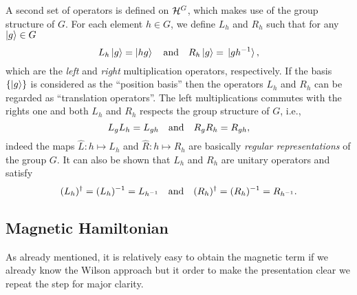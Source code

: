 A second set of operators is defined on $\mathcal{H}^{G}$, which makes use of the group structure of $G$.
For each element $h \in G$, we define $L_h$ and $R_h$ such that for any $\ket{g} \in G$
\begin{equation}
    L_h \ket{g} = \ket{hg}
    \qand
    R_h \ket{g} = \ket*{gh^{-1}},
\end{equation}
which are the \emph{left} and \emph{right} multiplication operators, respectively.
If the basis $\{\ket{g}\}$ is considered as the ``position basis'' then the operators $L_h$ and $R_h$ can be regarded as ``translation operators''.
The left multiplications commutes with the rights one and both $L_h$ and $R_h$ respects the group structure of $G$, i.e.,
\begin{equation}
    L_g L_h = L_{gh}
    \qand
    R_g R_h = R_{gh},
\end{equation}
indeed the maps $\hat{L}: h \mapsto L_h$ and $\hat{R}: h \mapsto R_h$ are basically \emph{regular representations} of the group $G$.
It can also be shown that $L_h$ and $R_h$ are unitary operators and satisfy
\begin{equation}
    (L_h)^{\dagger} = (L_h)^{-1} = L_{h^{-1}}
    \qand
    (R_h)^{\dagger} = (R_h)^{-1} = R_{h^{-1}}.
\end{equation}




\subsection{Magnetic Hamiltonian}
\label{sub:magnetic_hamiltonian}

As already mentioned, it is relatively easy to obtain the magnetic term if we already know the Wilson approach but it order to make the presentation clear we repeat the step for major clarity.

